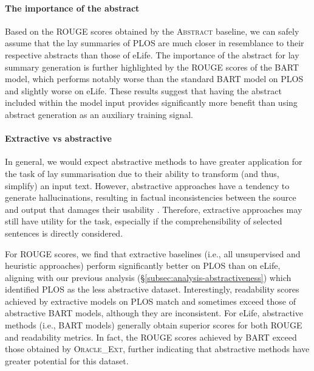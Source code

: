 \documentclass[11pt]{article}
\begin{document}
\paragraph{The importance of the abstract}
Based on the ROUGE scores obtained by the \textsc{Abstract} baseline, we can safely assume that the lay summaries of PLOS are much closer in resemblance to their respective abstracts than those of eLife. 
The importance of the abstract for lay summary generation is further highlighted by the ROUGE scores of the \textsc{BART} model, which performs notably worse than the standard \textsc{BART} model on PLOS and slightly worse on eLife. These results suggest that having the abstract included within the model input provides significantly more benefit than using abstract generation as an auxiliary training signal.

\paragraph{Extractive vs abstractive}
In general, we would expect abstractive methods to have greater application for the task of lay summarisation due to their ability to transform (and thus, simplify) an input text. However, abstractive approaches have a tendency to generate hallucinations, resulting in factual inconsistencies between the source and output that damages their usability \citep{Maynez2020-xd}. Therefore, extractive approaches may still have utility for the task, especially if the comprehensibility of selected sentences is directly considered. 

For ROUGE scores, we find that extractive baselines (i.e., all unsupervised and heuristic approaches) perform significantly better on PLOS than on eLife, aligning with our previous analysis (\S\ref{subsec:analysis-abstractiveness}) which identified PLOS as the less abstractive dataset.
Interestingly, readability scores achieved by extractive models on PLOS match and sometimes exceed those of abstractive \textsc{BART} models, although they are inconsistent. 
For eLife, abstractive methods (i.e., \textsc{BART} models) generally obtain superior scores for both ROUGE and readability metrics. In fact, the ROUGE scores achieved by \textsc{BART} exceed those obtained by \textsc{Oracle\_Ext}, further indicating that abstractive methods have greater potential for this dataset.
\end{document}
